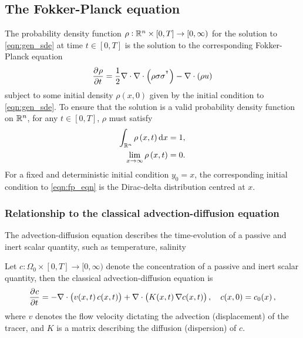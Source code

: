 \subsection{The Fokker-Planck equation}\label{sec:fp_eqn}
The probability density function \(\rho: \mathbb{R}^n \times [0,T] \to [0,\infty)\) for the solution to \eqref{eqn:gen_sde} at time \(t \in [0,T]\) is the solution to the corresponding Fokker-Planck equation \citep{Risken_2012_FokkerPlanckEquationMethods}
\begin{equation}
	\dpd{\rho}{t} = \frac12\nabla\cdot\nabla\cdot\left(\rho\sigma\sigma^{\T}\right) - \nabla\cdot\left(\rho u\right)
	\label{eqn:fp_eqn}
\end{equation}
subject to some initial density \(\rho\left(x,0\right)\) given by the initial condition to \eqref{eqn:gen_sde}.
To ensure that the solution is a valid probability density function on \(\mathbb{R}^n\), for any \(t \in [0,T]\), \(\rho\) must satisfy
\begin{subequations}\label{eqn:fp_valid_pdf}
	\begin{align}
		\int_{\R^n}{\rho\left(x, t\right)\dif x} = 1, \label{eqn:fp_valid_pdf_norm} \\
		\lim_{x \to \infty}\rho\left(x,t\right) = 0. \label{eqn:fp_valid_pdf_limit}
	\end{align}
\end{subequations}
For a fixed and deterministic initial condition \(y_0 = x\), the corresponding initial condition to \eqref{eqn:fp_eqn} is the Dirac-delta distribution centred at \(x\).


\subsubsection{Relationship to the classical advection-diffusion equation}
The advection-diffusion equation describes the time-evolution of a passive and inert scalar quantity, such as temperature, salinity

\citep{Visser_2008_LagrangianModellingPlankton}

Let \(c \colon \Omega_0 \times [0,T] \to [0, \infty)\) denote the concentration of a passive and inert scalar quantity, then the classical advection-diffusion equation is
\begin{equation}\label{eqn:advec_diff}
	\dpd{c}{t} = - \nabla\cdot \left(v\!\left(x,t\right)c\!\left(x,t\right)\right) + \nabla\cdot\left(K\!\left(x,t\right)\nabla c\!\left(x,t\right)\right), \quad c\!\left(x,0\right) = c_0\!\left(x\right),
\end{equation}
where \(v\) denotes the flow velocity dictating the advection (displacement) of the tracer, and \(K\) is a matrix describing the diffusion (dispersion) of \(c\).




